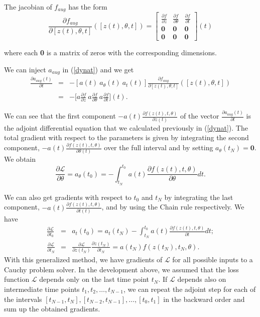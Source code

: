 \documentclass[10pt,a4paper]{article}
\theoremstyle{definition}
\theoremstyle{plain}
\begin{document}
The jacobian of $f_{aug}$ has the form
\begin{equation*}
\frac{\partial f_{aug}}{\partial [z(t),\theta,t]}([z(t),\theta,t]) = \begin{bmatrix}
\frac{\partial f}{\partial z} & \frac{\partial f}{\partial \theta} & \frac{\partial f}{\partial t} \\
\textbf{0} & \textbf{0} & \textbf{0} \\
\textbf{0} & \textbf{0} & \textbf{0}
\end{bmatrix}(t)
\end{equation*}

where each \textbf{0} is a matrix of zeros with the corresponding dimensions.

We can inject $a_{aug}$ in (\ref{dynat}) and we get
\begin{eqnarray*}
\frac{\partial a_{aug}(t)}{\partial t} 
&=& - [a(t) \ a_\theta (t) \ a_t (t)]\frac{\partial f_{aug}}{\partial [ z(t),\theta , t]}([z(t),\theta , t]) \\
&=& -\Big[a\frac{\partial f}{\partial z} \ a\frac{\partial f}{\partial \theta} \ a\frac{\partial  f}{\partial t}\Big] (t).
\end{eqnarray*}


We can see that the first component $-a(t)\frac{\partial f(z(t),t,\theta)}{\partial z(t)}$ of the vector $\frac{\partial a_{aug}(t)}{\partial t} $ is the adjoint differential equation that we calculated previously in (\ref{dynat}). The total gradient with respect to the parameters is given by integrating the second component, $-a(t)\frac{\partial f(z(t),t,\theta)}{\partial \theta(t)}$ over the full interval and by setting $a_\theta (t_N) = \textbf{0}$. We obtain 
\begin{equation*}
\frac{\partial \mathcal{L}}{\partial \theta} = a_\theta (t_0) = - \int_{t_N}^{t_0} a(t) \frac{\partial f(z(t),t,\theta)}{\partial \theta} dt.
\end{equation*}


We can also get gradients with respect to $t_0$ and $t_N$ by integrating the last component, $-a(t)\frac{\partial f(z(t),t,\theta)}{\partial t(t)}$, and by using the Chain rule respectively. We have
\begin{eqnarray*}
\frac{\partial \mathcal{L}}{\partial t_0} &=& a_t(t_0) = a_t(t_N) - \int_{t_N}^{t_0} a(t) \frac{\partial f(z(t),t,\theta)}{\partial t} dt ; \\
\frac{\partial \mathcal{L}}{\partial t_N} &=& \frac{\partial \mathcal{L}}{\partial z(t_N)} \frac{\partial z(t_N)}{\partial t_N} = a(t_N)f(z(t_N),t_N,\theta).
\end{eqnarray*}
With this generalized method, we have gradients of $\mathcal{L}$ for all possible inputs to a Cauchy problem solver. In the development above, we assumed that the loss function $\mathcal{L}$ depends only on the last time point $t_N$. If $\mathcal{L}$ depends also on intermediate time points $t_1, t_2, \dots , t_{N-1}$, we can repeat the adjoint step for each of the intervals $[t_{N-1}, t_N ],[t_{N-2}, t_{N-1}], \dots , [t_0,t_1]$ in the backward order and sum up the obtained gradients.
\end{document}

